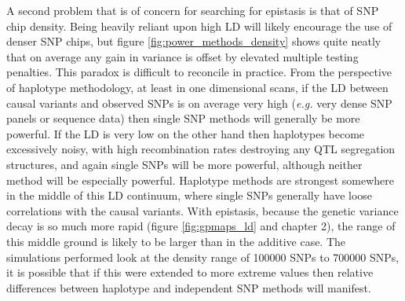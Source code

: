 A second problem that is of concern for searching for epistasis is that of SNP chip density. Being heavily reliant upon high LD will likely encourage the use of denser SNP chips, but figure \ref{fig:power_methods_density} shows quite neatly that on average any gain in variance is offset by elevated multiple testing penalties. This paradox is difficult to reconcile in practice. From the perspective of haplotype methodology, at least in one dimensional scans, if the LD between causal variants and observed SNPs is on average very high (\emph{e.g.} very dense SNP panels or sequence data) then single SNP methods will generally be more powerful. If the LD is very low on the other hand then haplotypes become excessively noisy, with high recombination rates destroying any QTL segregation structures, and again single SNPs will be more powerful, although neither method will be especially powerful. Haplotype methods are strongest somewhere in the middle of this LD continuum, where single SNPs generally have loose correlations with the causal variants. With epistasis, because the genetic variance decay is so much more rapid (figure \ref{fig:gpmaps_ld} and chapter 2), the range of this middle ground is likely to be larger than in the additive case. The simulations performed look at the density range of 100000 SNPs to 700000 SNPs, it is possible that if this were extended to more extreme values then relative differences between haplotype and independent SNP methods will manifest.

